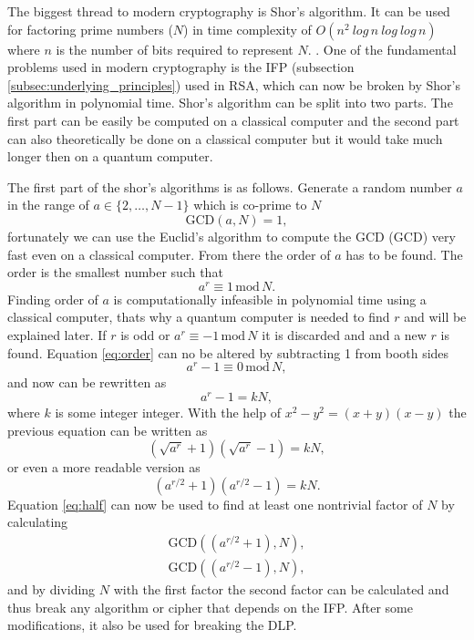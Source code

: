 The biggest thread to modern cryptography is Shor's algorithm. It can be used for factoring prime numbers ($N$) in time complexity of $O(n^2\ log\,n\ log\ log\,n)$ where $n$ is the number of bits required to represent $N$. \cite{Yanofsky2008}. One of the fundamental problems used in modern cryptography is the IFP (subsection \ref{subsec:underlying_principles}) used in RSA, which can now be broken by Shor’s algorithm in polynomial time. Shor's algorithm can be split into two parts. The first part can be easily be computed on a classical computer and the second part can also theoretically be done on a classical computer but it would take much longer then on a quantum computer.

The first part of the shor's algorithms is as follows. Generate a random number $a$ in the range of $a\in\{2,\dots,N-1\}$ which is co-prime to $N$
\begin{equation}
  \mathrm{GCD}(a, N) = 1,
\end{equation}
fortunately we can use the Euclid's algorithm to compute the GCD (\acl{GCD}) very fast even on a classical computer. From there the order of $a$ has to be found. The order is the smallest number such that
\begin{equation}
  \label{eq:order}
  a^r \equiv 1\,\mathrm{mod}\,N.
\end{equation}
Finding order of $a$ is computationally infeasible in polynomial time using a classical computer, thats why a quantum computer is needed to find $r$ and will be explained later. If $r$ is odd or $a^r\equiv-1\,\mathrm{mod}\,N$ it is discarded and and a new $r$ is found. Equation \ref{eq:order} can no be altered by subtracting 1 from booth sides
\begin{equation}
  a^r -1\equiv 0\,\mathrm{mod}\,N,
\end{equation}
and now can be rewritten as
\begin{equation}
  a^r -1=kN,
\end{equation}
where $k$ is some integer integer. With the help of $x^2 - y^2=(x+y)(x-y)$ the previous equation can be written as
\begin{equation}
  (\sqrt{a^r}+1)(\sqrt{a^r}-1)= kN,
\end{equation}
or even a more readable version as
\begin{equation}
  \label{eq:half}
  (a^{r/2}+1)(a^{r/2}-1)= kN.
\end{equation}
Equation \ref{eq:half} can now be used to find at least one nontrivial factor of $N$ by calculating
\begin{equation}
  \begin{aligned}
    \mathrm{GCD}((a^{r/2}+1), N), \\
    \mathrm{GCD}((a^{r/2}-1), N),
  \end{aligned}
\end{equation}
and by dividing $N$ with the first factor the second factor can be calculated and thus break any algorithm or cipher that depends on the IFP. After some modifications, it also be used for breaking the DLP. \cite{Yanofsky2008}\cite{Pittenger2000}

